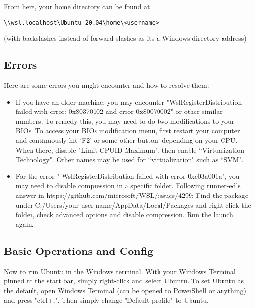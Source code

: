 From here, your home directory can be found at
\begin{lstlisting}
\\wsl.localhost\Ubuntu-20.04\home\<username>
\end{lstlisting}
(with backslashes instead of forward slashes as its a Windows directory address)

\subsection{Errors}
Here are some errors you might encounter and how to resolve them:
\begin{itemize}
    \item If you have an older machine, you may encounter
        "WslRegisterDistribution failed with error: 0x80370102 and error
        0x80070002" or other similar numbers. To remedy this, you may need to do
        two modifications to your BIOs. To access your BIOs modification menu,
        first restart your computer and continuously hit `F2' or some other
        button, depending on your CPU. When there, disable
        "Limit CPUID Maximum", then enable ``Virtualization Technology".
        Other names may be used for ``virtualization" such as ``SVM".
    \item For the error " WslRegisterDistribution  failed with error
        0xc03a001a", you may need to disable compression in a specific folder.
        Following runner-ed's answer in
        https://github.com/microsoft/WSL/issues/4299: Find the package under
        C:/Users/\tlangle your user name\trangle/AppData/Local/Packages and right click the
        folder, check advanced options and disable compression. Run the launch
        again.
\end{itemize}

\subsection{Basic Operations and Config}
Now to run Ubuntu in the Windows terminal. With your Windows Terminal pinned to
the start bar, simply right-click and select Ubuntu. To set Ubuntu as the
default, open Windows Terminal (can be opened to PowerShell or anything) and
press "ctrl+,". Then simply change "Default profile" to Ubuntu.\\

